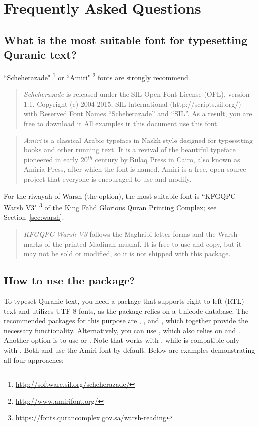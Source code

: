 \documentclass{ltxdoc}
\begin{document}
\section{Frequently Asked Questions}
    \subsection{What is the most suitable font for typesetting Quranic text?}
    ``Scheherazade"%
    \footnote{\url{http://software.sil.org/scheherazade/}}
    or ``Amiri"%
    \footnote{\url{http://www.amirifont.org/}} fonts
    are strongly recommend.
    \begin{quote}
    \emph{Scheherazade} is released under the SIL Open Font License (OFL), version 1.1. Copyright (c) 2004-2015,
    SIL International (http://scripts.sil.org/) with Reserved Font Names ``Scheherazade'' and ``SIL''.
    As a result, you are free to download it
    All examples in this document use this font.
    \end{quote}
    \begin{quote}
    \emph{Amiri} is a classical Arabic typeface in Naskh style
    designed for typesetting books and other running text.
    It is a revival of the beautiful typeface pioneered in early 20$^{th}$ century by Bulaq Press in Cairo,
    also known as Amiria Press, after which the font is named.
    Amiri is a free, open source project that everyone is encouraged to use and modify.
    \end{quote}
    For the riwayah of Warsh (the  option), the most suitable font is
    ``KFGQPC Warsh V3"%
    \footnote{\url{https://fonts.qurancomplex.gov.sa/warsh-reading}}
    of the King Fahd Glorious Quran Printing Complex; see Section~\ref{sec:warsh}.
    \begin{quote}
    \emph{KFGQPC Warsh V3} follows the Maghribi letter forms and the Warsh marks of the printed Madinah mushaf.
    It is free to use and copy, but it may not be sold or modified,
    so it is not shipped with this package.
    \end{quote}

    \subsection{How to use the  package?}

    To typeset Quranic text, you need a package that supports right-to-left (RTL) text and utilizes UTF-8 fonts,
    as the  package relies on a Unicode database.
    The recommended packages for this purpose are , , and ,
    which together provide the necessary functionality. Alternatively, you can use ,
    which also relies on  and .
    Another option is to use  or .
    Note that  works with \XeLaTeX,
    while  is compatible only with \LuaLaTeX.
    Both  and  use the Amiri font by default.
    Below are examples demonstrating all four approaches:
\end{document}
